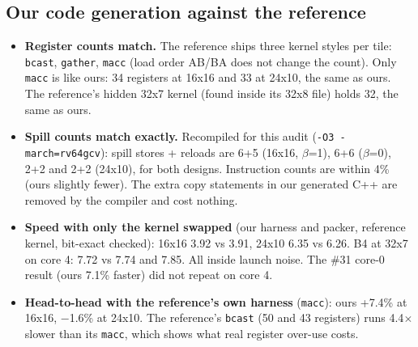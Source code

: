 \documentclass[10pt,a4paper]{article}
\begin{document}
\subsection{Our code generation against the reference}
\begin{itemize}
  \item \textbf{Register counts match.} The reference ships three kernel styles per tile: \texttt{bcast},
  \texttt{gather}, \texttt{macc} (load order AB/BA does not change the count). Only \texttt{macc} is
  like ours: 34 registers at 16x16 and 33 at 24x10, the same as ours. The reference's hidden 32x7
  kernel (found inside its 32x8 file) holds 32, the same as ours.
  \item \textbf{Spill counts match exactly.} Recompiled for this audit
  (\texttt{-O3 -march=rv64gcv}): spill stores + reloads are 6+5 (16x16, $\beta$=1), 6+6 ($\beta$=0),
  2+2 and 2+2 (24x10), for both designs. Instruction counts are within 4\% (ours slightly fewer). The
  extra copy statements in our generated C++ are removed by the compiler and cost nothing.
  \item \textbf{Speed with only the kernel swapped} (our harness and packer, reference kernel,
  bit-exact checked): 16x16 3.92 vs 3.91, 24x10 6.35 vs 6.26. B4 at 32x7 on core 4: 7.72 vs 7.74 and
  7.85. All inside launch noise. The \#31 core-0 result (ours 7.1\% faster) did not repeat on core 4.
  \item \textbf{Head-to-head with the reference's own harness} (\texttt{macc}): ours +7.4\% at 16x16,
  $-$1.6\% at 24x10. The reference's \texttt{bcast} (50 and 43 registers) runs 4.4$\times$ slower than
  its \texttt{macc}, which shows what real register over-use costs.
\end{itemize}
\end{document}
